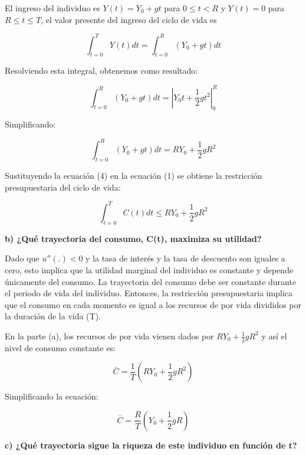 \documentclass[
]{article}
\begin{document}
El ingreso del individuo es \(Y(t)=Y_0+gt\) para \(0\leq t<R\) y
\(Y(t)=0\) para \(R\leq t \leq T\), el valor presente del ingreso del
ciclo de vida es

\begin{equation}
\int_{t=0}^{T}Y(t)dt=\int_{t=0}^{R}(Y_0+gt)dt
\end{equation}

Resolviendo esta integral, obtenemos como resultado:

\begin{equation}
\int_{t=0}^{R}(Y_0+gt)dt=\left|Y_0t+\frac{1}{2}gt^2\right|_{0}^{R}
\end{equation}

Simplificando:

\begin{equation}
\int_{t=0}^{R}(Y_0+gt)dt=RY_0+\frac{1}{2}gR^2
\end{equation}

Sustituyendo la ecuación (4) en la ecuación (1) se obtiene la
restricción presupuestaria del ciclo de vida:

\begin{equation}
\int_{t=0}^{T} C(t)dt\leqslant RY_0+\frac{1}{2}gR^2
\end{equation}

\textbf{b) ¿Qué trayectoria del consumo, C(t), maximiza su utilidad?}

Dado que \(u''(.)<0\) y la tasa de interés y la tasa de descuento son
iguales a cero, esto implica que la utilidad marginal del individuo es
constante y depende únicamente del consumo. La trayectoria del consumo
debe ser constante durante el periodo de vida del individuo. Entonces,
la restricción presupuestaria implica que el consumo en cada momento es
igual a los recursos de por vida divididos por la duración de la vida
(T).

En la parte (a), los recursos de por vida vienen dados por
\(RY_0+\frac{1}{2}gR^2\) y así el nivel de consumo constante es:

\begin{equation}
\bar C= \frac {1}{T} (RY_0+\frac{1}{2}gR^2)
\end{equation}

Simplificando la ecuación:

\begin{equation}
\bar C= \frac {R}{T} (Y_0+\frac{1}{2}gR)
\end{equation}

\textbf{c) ¿Qué trayectoria sigue la riqueza de este individuo en
función de t?}
\end{document}
